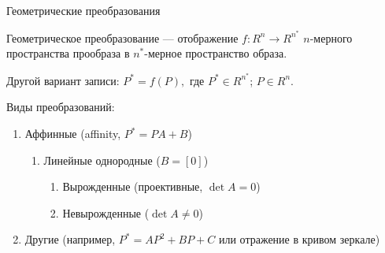 \documentclass{beamer}
\begin{document}
	\begin{frame}{Геометрические преобразования}
				
		Геометрическое преобразование --- отображение $f:R^n \to R^{n^{*}}$ $n$-мерного пространства прообраза в $n^{*}$-мерное пространство образа.

		Другой вариант записи:	
		$
			P^{*}=f(P)
			,
		$
		где 
		$P^{*} \in R^{n^{*}}$;
		$P \in R^n $.
		
		Виды преобразований:
		\begin{enumerate}
			\item Аффинные (affinity, $P^{*} = P  A+B$)
				\begin{enumerate}
					\item Линейные однородные ($B = [0]$)
					\begin{enumerate}
						\item Вырожденные (проективные, $\det{A} = 0$)
						\item Невырожденные ($\det{A}\neq 0$)
					\end{enumerate}
				\end{enumerate}
			\item Другие (например, $P^{*}=A P^2+B P+ C$ или отражение в кривом зеркале)
		\end{enumerate}

\end{frame}
\end{document}
